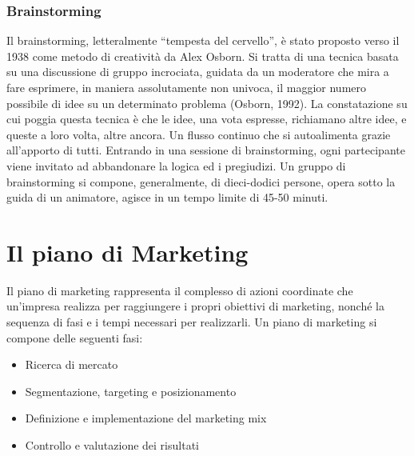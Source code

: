 \subsubsection*{Brainstorming}
Il brainstorming, letteralmente “tempesta del cervello”, è stato proposto verso il 1938 come metodo di creatività da Alex Osborn. Si tratta di una tecnica basata su una discussione di gruppo incrociata, guidata da un moderatore che mira a fare esprimere, in maniera assolutamente non univoca, il maggior numero possibile di idee su un determinato problema (Osborn, 1992). \newline
La constatazione su cui poggia questa tecnica è che le idee, una vota espresse, richiamano altre idee, e queste a loro volta, altre ancora. Un flusso continuo che si autoalimenta grazie all’apporto di tutti. Entrando in una sessione di brainstorming, ogni partecipante viene invitato ad abbandonare la logica ed i pregiudizi. Un gruppo di brainstorming si compone, generalmente, di dieci-dodici persone, opera sotto la guida di un animatore, agisce in un tempo limite di 45-50 minuti.

\section{Il piano di Marketing}
Il piano di marketing rappresenta il complesso di azioni coordinate che un’impresa realizza per raggiungere i propri obiettivi di marketing, nonché la sequenza di fasi e i tempi necessari per realizzarli. \newline
Un piano di marketing si compone delle seguenti fasi:
\begin{itemize}  
	\item Ricerca di mercato
	\item Segmentazione, targeting e posizionamento 
	\item Definizione e implementazione del marketing mix
	\item Controllo e valutazione dei risultati
\end{itemize}
